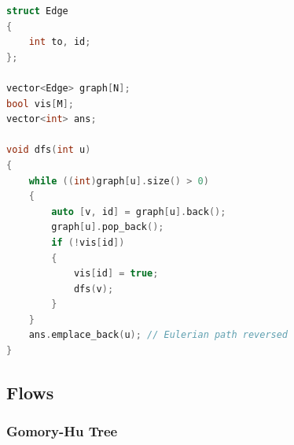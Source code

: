 \documentclass[10pt,landscape,a4paper,twocolumn]{article}
\begin{document}
\begin{lstlisting}[language=C++]
struct Edge
{
    int to, id;
};

vector<Edge> graph[N];
bool vis[M];
vector<int> ans;

void dfs(int u)
{
    while ((int)graph[u].size() > 0)
    {
        auto [v, id] = graph[u].back();
        graph[u].pop_back();
        if (!vis[id])
        {
            vis[id] = true;
            dfs(v);
        }
    }
    ans.emplace_back(u); // Eulerian path reversed
}

\end{lstlisting}
\subsection{Flows}
\subsubsection{Gomory-Hu Tree}
\end{document}
